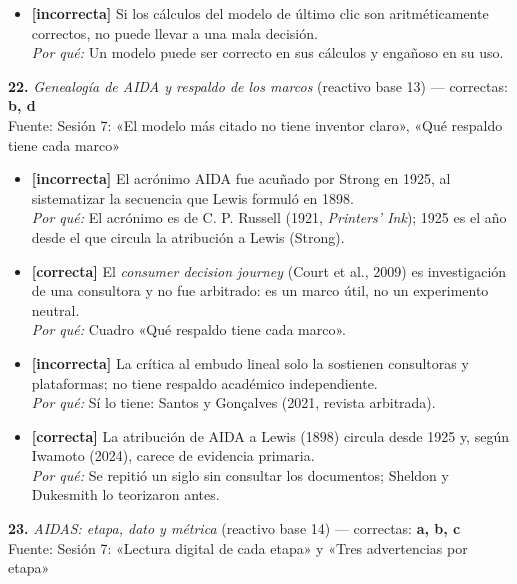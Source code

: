 \documentclass[10pt,letterpaper]{article}
\begin{document}
{\begin{itemize}[leftmargin=1.2em,itemsep=0pt,topsep=1pt,parsep=0pt]
\item[\textbf{d)}] {\footnotesize \textbf{[incorrecta]} Si los cálculos del modelo de último clic son aritméticamente correctos, no puede llevar a una mala decisión.\\ \textit{Por qué:} Un modelo puede ser correcto en sus cálculos y engañoso en su uso.}
\end{itemize}
\vspace{3pt}\noindent\textbf{22.} \textit{Genealogía de AIDA y respaldo de los marcos} (reactivo base 13) — correctas: \textbf{b, d}\\[-1pt]
{\scriptsize Fuente: Sesión 7: «El modelo más citado no tiene inventor claro», «Qué respaldo tiene cada marco»}
\begin{itemize}[leftmargin=1.2em,itemsep=0pt,topsep=1pt,parsep=0pt]
\item[\textbf{a)}] {\footnotesize \textbf{[incorrecta]} El acrónimo AIDA fue acuñado por Strong en 1925, al sistematizar la secuencia que Lewis formuló en 1898.\\ \textit{Por qué:} El acrónimo es de C. P. Russell (1921, \textit{Printers' Ink}); 1925 es el año desde el que circula la atribución a Lewis (Strong).}
\item[\textbf{b)}] {\footnotesize \textbf{[correcta]} El \textit{consumer decision journey} (Court et al., 2009) es investigación de una consultora y no fue arbitrado: es un marco útil, no un experimento neutral.\\ \textit{Por qué:} Cuadro «Qué respaldo tiene cada marco».}
\item[\textbf{c)}] {\footnotesize \textbf{[incorrecta]} La crítica al embudo lineal solo la sostienen consultoras y plataformas; no tiene respaldo académico independiente.\\ \textit{Por qué:} Sí lo tiene: Santos y Gonçalves (2021, revista arbitrada).}
\item[\textbf{d)}] {\footnotesize \textbf{[correcta]} La atribución de AIDA a Lewis (1898) circula desde 1925 y, según Iwamoto (2024), carece de evidencia primaria.\\ \textit{Por qué:} Se repitió un siglo sin consultar los documentos; Sheldon y Dukesmith lo teorizaron antes.}
\end{itemize}
\vspace{3pt}\noindent\textbf{23.} \textit{AIDAS: etapa, dato y métrica} (reactivo base 14) — correctas: \textbf{a, b, c}\\[-1pt]
{\scriptsize Fuente: Sesión 7: «Lectura digital de cada etapa» y «Tres advertencias por etapa»}
}
\end{document}
